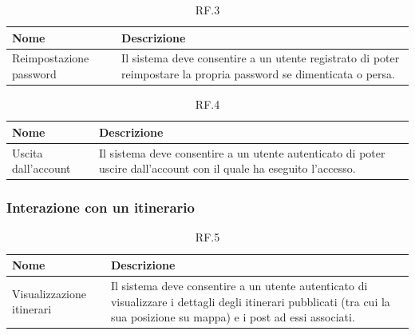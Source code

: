 \documentclass{natourDoc}
\begin{document}
\begin{table}[H]
	\centering
	\begin{tabular}{ |p{5cm}|p{10.3cm}| }
		\hline
		\rowcolor{PineGreen!70}
		\textbf{Nome}           & \textbf{Descrizione}                                                                                                \\
		\hline
		Reimpostazione password & Il sistema deve consentire a un utente registrato di poter reimpostare la propria password se dimenticata o persa. \\
		\hline
	\end{tabular}
	\caption{RF.3}

\end{table}

\begin{table}[H]
	\centering
	\begin{tabular}{ |p{5cm}|p{10.3cm}| }
		\hline
		\rowcolor{PineGreen!70}
		\textbf{Nome}       & \textbf{Descrizione}                                                                                               \\
		\hline
		Uscita dall'account & Il sistema deve consentire a un utente autenticato di poter uscire dall'account con il quale ha eseguito l'accesso. \\
		\hline
	\end{tabular}
	\caption{RF.4}

\end{table}


\subsubsection{Interazione con un itinerario}
\begin{table}[H]
	\centering
	\begin{tabular}{ |p{5cm}|p{10.3cm}| }
		\hline
		\rowcolor{PineGreen!70}
		\textbf{Nome}             & \textbf{Descrizione}                                                 \\
		\hline
		Visualizzazione itinerari & Il sistema deve consentire a un utente autenticato di visualizzare i
		dettagli degli itinerari pubblicati (tra cui la sua posizione su mappa) e i post ad essi associati.                                  \\
		\hline
	\end{tabular}
	\caption{RF.5}

\end{table}
\end{document}
